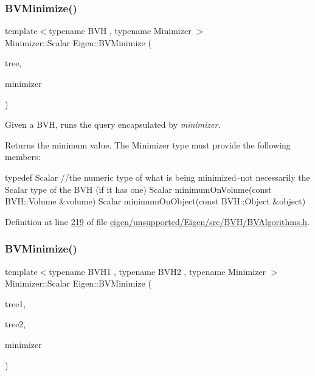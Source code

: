 \subsubsection{\texorpdfstring{B\+V\+Minimize()}{BVMinimize()}\hspace{0.1cm}{\footnotesize\ttfamily [1/2]}}
{\footnotesize\ttfamily template$<$typename B\+VH , typename Minimizer $>$ \\
Minimizer\+::\+Scalar Eigen\+::\+B\+V\+Minimize (\begin{DoxyParamCaption}\item[{const B\+VH \&}]{tree,  }\item[{Minimizer \&}]{minimizer }\end{DoxyParamCaption})}

Given a B\+VH, runs the query encapsulated by {\itshape minimizer}. \begin{DoxyReturn}{Returns}
the minimum value. The Minimizer type must provide the following members\+:
\begin{DoxyCode}
\textcolor{keyword}{typedef} Scalar \textcolor{comment}{//the numeric type of what is being minimized--not necessarily the Scalar type of the BVH
       (if it has one)}
Scalar minimumOnVolume(\textcolor{keyword}{const} BVH::Volume &volume)
Scalar minimumOnObject(\textcolor{keyword}{const} BVH::Object &\textcolor{keywordtype}{object})
\end{DoxyCode}
 
\end{DoxyReturn}


Definition at line \hyperlink{eigen_2unsupported_2_eigen_2src_2_b_v_h_2_b_v_algorithms_8h_source_l00219}{219} of file \hyperlink{eigen_2unsupported_2_eigen_2src_2_b_v_h_2_b_v_algorithms_8h_source}{eigen/unsupported/\+Eigen/src/\+B\+V\+H/\+B\+V\+Algorithms.\+h}.

\mbox{\label{namespace_eigen_a915f6adc8b195c94a83c35de6a842556}} 
\subsubsection{\texorpdfstring{B\+V\+Minimize()}{BVMinimize()}\hspace{0.1cm}{\footnotesize\ttfamily [2/2]}}
{\footnotesize\ttfamily template$<$typename B\+V\+H1 , typename B\+V\+H2 , typename Minimizer $>$ \\
Minimizer\+::\+Scalar Eigen\+::\+B\+V\+Minimize (\begin{DoxyParamCaption}\item[{const B\+V\+H1 \&}]{tree1,  }\item[{const B\+V\+H2 \&}]{tree2,  }\item[{Minimizer \&}]{minimizer }\end{DoxyParamCaption})}

